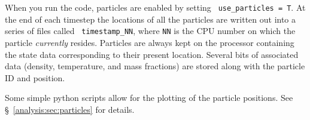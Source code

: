 When you run the code, particles are enabled by setting {\tt
  use\_particles = T}.  At the end of each timestep the locations of
all the particles are written out into a series of files called {\tt
  timestamp\_NN}, where {\tt NN} is the CPU number on which the
particle {\em currently} resides.  Particles are always kept on the
processor containing the state data corresponding to their present
location.  Several bits of associated data (density, temperature, and
mass fractions) are stored along with the particle ID and position.

Some simple python scripts allow for the plotting of the particle
positions.  See \S~\ref{analysis:sec:particles} for details.


